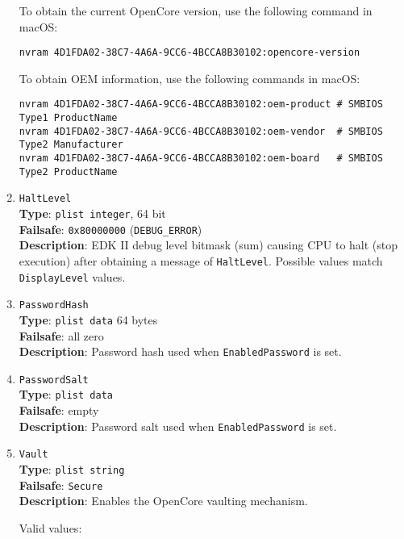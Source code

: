 \documentclass[]{article}
\begin{document}
\begin{enumerate}
  To obtain the current OpenCore version, use the following command in macOS:
\begin{lstlisting}[label=nvramver, style=ocbash]
nvram 4D1FDA02-38C7-4A6A-9CC6-4BCCA8B30102:opencore-version
\end{lstlisting}

  To obtain OEM information, use the following commands in macOS:
\begin{lstlisting}[label=nvramoem, style=ocbash]
nvram 4D1FDA02-38C7-4A6A-9CC6-4BCCA8B30102:oem-product # SMBIOS Type1 ProductName
nvram 4D1FDA02-38C7-4A6A-9CC6-4BCCA8B30102:oem-vendor  # SMBIOS Type2 Manufacturer
nvram 4D1FDA02-38C7-4A6A-9CC6-4BCCA8B30102:oem-board   # SMBIOS Type2 ProductName
\end{lstlisting}

\item
  \texttt{HaltLevel}\\
  \textbf{Type}: \texttt{plist\ integer}, 64 bit\\
  \textbf{Failsafe}: \texttt{0x80000000} (\texttt{DEBUG\_ERROR})\\
  \textbf{Description}: EDK II debug level bitmask (sum) causing CPU to
  halt (stop execution) after obtaining a message of \texttt{HaltLevel}.
  Possible values match \texttt{DisplayLevel} values.

\item
  \texttt{PasswordHash}\\
  \textbf{Type}: \texttt{plist\ data} 64 bytes\\
  \textbf{Failsafe}: all zero\\
  \textbf{Description}: Password hash used when \texttt{EnabledPassword} is set.

\item
  \texttt{PasswordSalt}\\
  \textbf{Type}: \texttt{plist\ data}\\
  \textbf{Failsafe}: empty\\
  \textbf{Description}: Password salt used when \texttt{EnabledPassword} is set.

\item \label{securevaulting}
  \texttt{Vault}\\
  \textbf{Type}: \texttt{plist\ string}\\
  \textbf{Failsafe}: \texttt{Secure}\\
  \textbf{Description}: Enables the OpenCore vaulting mechanism.

  Valid values:


\end{enumerate}
\end{document}

